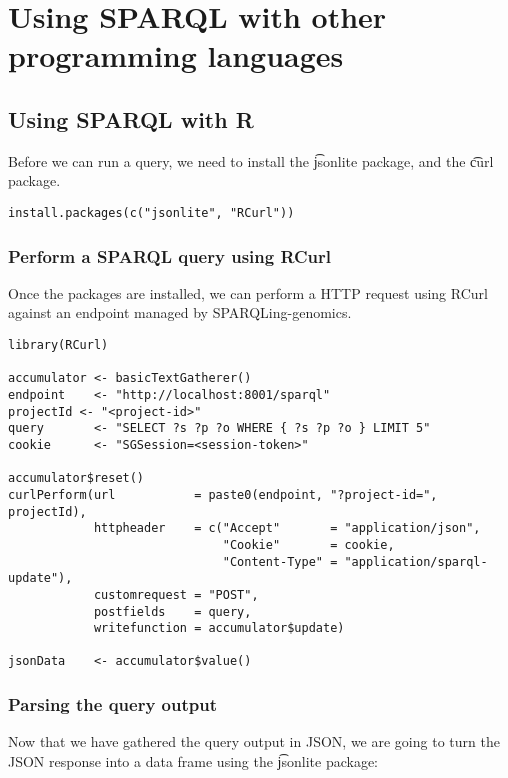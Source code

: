 \chapter{Using SPARQL with other programming languages}
\label{chap:programming}

\section{Using SPARQL with R}

  Before we can run a query, we need to install the \t{jsonlite} package,
  and the \t{curl} package.

\begin{siderules}
\begin{verbatim}
install.packages(c("jsonlite", "RCurl"))
\end{verbatim}
\end{siderules}

\subsection{Perform a SPARQL query using RCurl}

  Once the packages are installed, we can perform a HTTP request using RCurl
  against an endpoint managed by SPARQLing-genomics.

\begin{siderules}
\begin{verbatim}
library(RCurl)

accumulator <- basicTextGatherer()
endpoint    <- "http://localhost:8001/sparql"
projectId <- "<project-id>"
query       <- "SELECT ?s ?p ?o WHERE { ?s ?p ?o } LIMIT 5"
cookie      <- "SGSession=<session-token>"

accumulator$reset()
curlPerform(url           = paste0(endpoint, "?project-id=", projectId),
            httpheader    = c("Accept"       = "application/json",
                              "Cookie"       = cookie,
                              "Content-Type" = "application/sparql-update"),
            customrequest = "POST",
            postfields    = query,
            writefunction = accumulator$update)

jsonData    <- accumulator$value()
\end{verbatim}
\end{siderules}

\subsection{Parsing the query output}
  Now that we have gathered the query output in JSON, we are going to turn
  the JSON response into a data frame using the \t{jsonlite} package:

